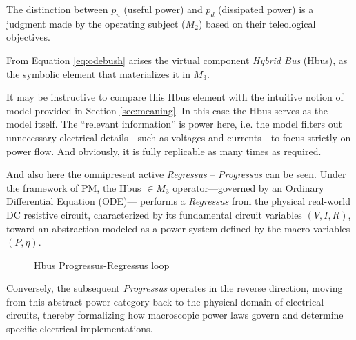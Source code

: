 \documentclass[11pt, a4paper]{article}
\begin{document}
The distinction between $p_u$ (useful power) and $p_d$ (dissipated power) is a judgment made by the operating subject ($M_2$) based on their teleological objectives.

From Equation \ref{eq:odebush} arises the virtual component \textit{Hybrid Bus} (Hbus), as the symbolic element that materializes it in $M_3$.

It may be instructive to compare this Hbus element with the intuitive notion of model
provided in Section \ref{sec:meaning}. In this case the Hbus serves as the model itself. The ``relevant information'' is power here, i.e. the model filters out unnecessary electrical details—such as voltages and currents—to focus strictly on power flow. And obviously, it is fully replicable as many times as required.


And also here the omnipresent active \textit{Regressus} -- \textit{Progressus} can be seen.
Under the framework of PM, the Hbus $\in M_3$
operator—governed by an Ordinary Differential Equation (ODE)— performs a
\textit{Regressus} from the physical real-world DC resistive circuit,  characterized by its fundamental circuit variables $(V, I, R)$, toward an abstraction modeled as a power system defined by the macro-variables $(P, \eta)$.

\begin{figure}[h!]
\begin{center}
\vspace{-4mm}
\end{center}
\caption{Hbus Progressus-Regressus loop}
\end{figure}

Conversely, the subsequent \textit{Progressus} operates in the reverse direction, moving from this abstract power category back to the physical domain of electrical circuits, thereby formalizing how macroscopic power laws govern and determine specific electrical implementations.
\end{document}
